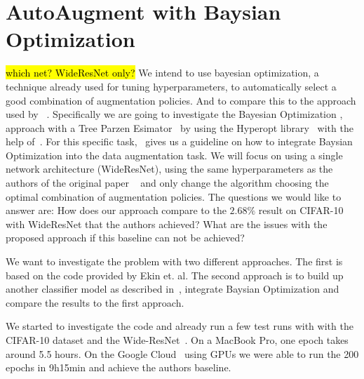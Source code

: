 \documentclass[10pt,twocolumn,letterpaper]{article}
\begin{document}
\section{AutoAugment with Baysian Optimization}
\hl{which net? WideResNet only?}\newline
We intend to use bayesian optimization, a technique already used for tuning hyperparameters, to automatically select a good combination of augmentation policies. And to compare this to the approach used by ~\cite{Ekin}.
Specifically we are going to investigate the Bayesian Optimization \cite{2018arXiv180702811F},~\cite{Goodfellow-et-al-2016} approach with a Tree Parzen Esimator~\cite{Kaggle_AMT} by using the Hyperopt library~\cite{HyperOpt} with the help of~\cite{BO_Hyperopt}. For this specific task,~\cite{2017arXiv171010564T} gives us a guideline on how to integrate Baysian Optimization into the data augmentation task.
We will focus on using a single network architecture (WideResNet), using the same hyperparameters as the authors of the original paper ~\cite{Ekin} and only change the algorithm choosing the optimal combination of augmentation policies. The questions we would like to answer are: How does our approach compare to the $2.68\%$ result on CIFAR-10 with WideResNet that the authors achieved? What are the issues with the proposed approach if this baseline can not be achieved?

We want to investigate the problem with two different approaches. The first is based on the code provided by Ekin et. al. The second approach is to build up another classifier model as described in~\cite{cifar-10-cl}, integrate Baysian Optimization and compare the results to the first approach.

We started to investigate the code and already run a few test runs with with the CIFAR-10 dataset and the Wide-ResNet~\cite{Ekin}. On a MacBook Pro, one epoch takes around 5.5 hours. On the Google Cloud~\cite{GCloud} using GPUs we were able to run the 200 epochs in 9h15min and achieve the authors baseline.




{\small


}
\end{document}
